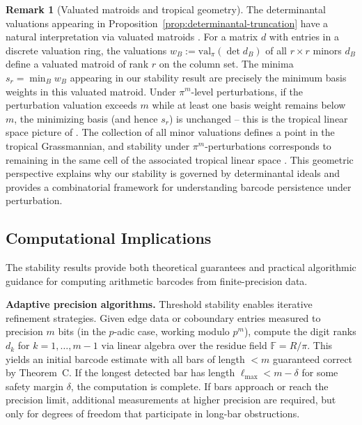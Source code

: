 \documentclass[11pt]{amsart}
\theoremstyle{plain}
\theoremstyle{definition}
\newtheorem{remark}[theorem]{Remark}
\newcommand{\valpi}{\mathrm{val}_{\unif}}                   %
\newcommand{\Ring}{R}                          %
\newcommand{\unif}{\pi}                        %
\newcommand{\coboundary}{d}                           %
\begin{document}
\begin{remark}[Valuated matroids and tropical geometry]
\label{rem:tropical-viewpoint}
The determinantal valuations appearing in Proposition~\ref{prop:determinantal-truncation} 
have a natural interpretation via valuated matroids \cite{DressWenzel1992_ValuatedMatroids}. 
For a matrix $\coboundary$ with entries in a discrete valuation ring, the valuations 
$w_B := \valpi(\det \coboundary_B)$ of all $r \times r$ minors $\coboundary_B$ define 
a valuated matroid of rank $r$ on the column set. The minima $s_r = \min_B w_B$ 
appearing in our stability result are precisely the minimum basis weights in this 
valuated matroid. Under $\unif^m$-level perturbations, if the perturbation valuation 
exceeds $m$ while at least one basis weight remains below $m$, the minimizing basis 
(and hence $s_r$) is unchanged -- this is the tropical linear space picture of 
\cite{SpeyerSturmfels2004_TropicalGrassmannian,Speyer2008_TropicalLinearSpaces}. 
The collection of all minor valuations defines a point in the tropical Grassmannian, 
and stability under $\unif^m$-perturbations corresponds to remaining in the same 
cell of the associated tropical linear space \cite{MaclaganSturmfels2015_TropicalGeometry}. 
This geometric perspective explains why our stability is governed by determinantal 
ideals and provides a combinatorial framework for understanding barcode persistence 
under perturbation.
\end{remark}
\subsection{Computational Implications}
\label{ssec:computational-implications}

The stability results provide both theoretical guarantees and practical algorithmic guidance for computing arithmetic barcodes from finite-precision data.

\textbf{Adaptive precision algorithms.}
Threshold stability enables iterative refinement strategies. Given edge data or coboundary entries measured to precision $m$ bits (in the $p$-adic case, working modulo $p^m$), compute the digit ranks $d_k$ for $k = 1, \ldots, m-1$ via linear algebra over the residue field $\mathbb{F} = \Ring/\unif$. This yields an initial barcode estimate with all bars of length $< m$ guaranteed correct by Theorem~C. If the longest detected bar has length $\ell_{\max} < m - \delta$ for some safety margin $\delta$, the computation is complete. If bars approach or reach the precision limit, additional measurements at higher precision are required, but only for degrees of freedom that participate in long-bar obstructions.
\end{document}
